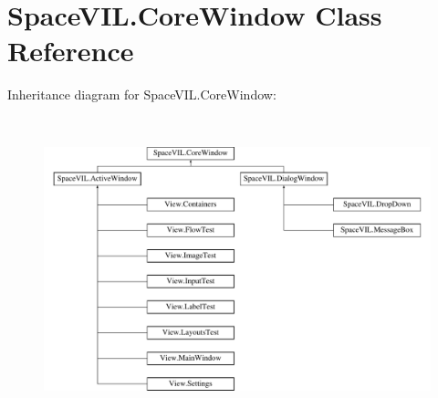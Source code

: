 \hypertarget{class_space_v_i_l_1_1_core_window}{}\section{Space\+V\+I\+L.\+Core\+Window Class Reference}
\label{class_space_v_i_l_1_1_core_window}
Inheritance diagram for Space\+V\+I\+L.\+Core\+Window\+:\begin{figure}[H]
\begin{center}
\leavevmode
\includegraphics[height=8.805032cm]{class_space_v_i_l_1_1_core_window}
\end{center}
\end{figure}
